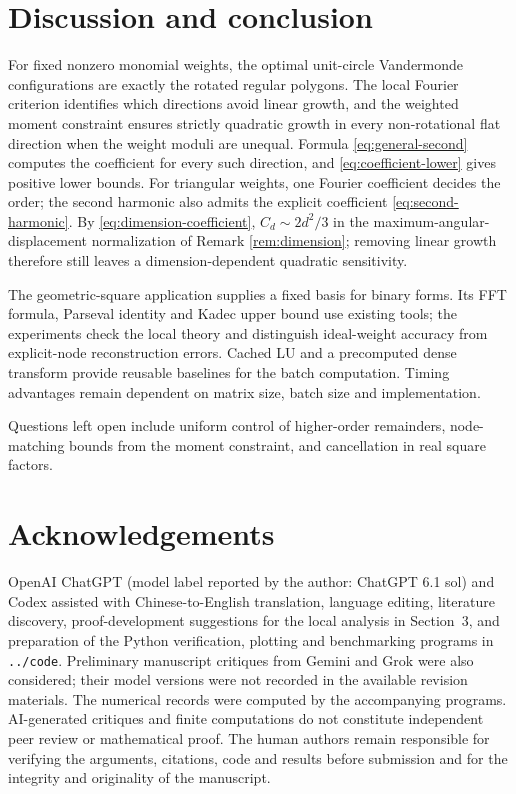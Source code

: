 \documentclass[10pt,twoside,final]{siamart1116}
\numberwithin{equation}{section}
\numberwithin{theorem}{section}
\begin{document}
\FloatBarrier
\section{Discussion and conclusion}\label{sec:conclusion}

For fixed nonzero monomial weights, the optimal unit-circle Vandermonde
configurations are exactly the rotated regular polygons. The local Fourier criterion
identifies which directions avoid linear growth, and the weighted moment constraint
ensures strictly quadratic growth in every non-rotational flat direction when the
weight moduli are unequal. Formula \eqref{eq:general-second} computes the coefficient
for every such direction, and \eqref{eq:coefficient-lower} gives positive lower bounds. For triangular weights, one Fourier coefficient decides
the order; the second harmonic also admits the explicit coefficient
\eqref{eq:second-harmonic}. By \eqref{eq:dimension-coefficient}, $C_d\sim2d^2/3$ in the
maximum-angular-displacement normalization of Remark \ref{rem:dimension};
removing linear growth therefore still leaves a dimension-dependent quadratic
sensitivity.

The geometric-square application supplies a fixed basis for binary forms. Its FFT
formula, Parseval identity and Kadec upper bound use existing tools; the experiments
check the local theory and distinguish ideal-weight accuracy from explicit-node
reconstruction errors. Cached LU and a precomputed dense transform provide reusable
baselines for the batch computation. Timing advantages remain dependent on matrix
size, batch size and implementation.

Questions left open include uniform control of higher-order remainders, node-matching
bounds from the moment constraint, and cancellation in real square factors.

\clearpage
\section*{Acknowledgements}
OpenAI ChatGPT (model label reported by the author: ChatGPT 6.1 sol) and
Codex assisted with Chinese-to-English translation, language editing, literature
discovery, proof-development suggestions for the local analysis in Section~3,
and preparation of the Python verification, plotting and benchmarking programs
in \texttt{../code}. Preliminary manuscript critiques from Gemini and Grok were
also considered; their model versions were not recorded in the available
revision materials. The numerical records were computed by the accompanying
programs. AI-generated critiques and finite computations do not constitute
independent peer review or mathematical proof. The human authors remain
responsible for verifying the arguments, citations, code and results before
submission and for the integrity and originality of the manuscript.
\end{document}
